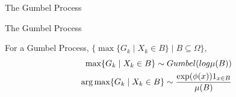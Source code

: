 \begin{frame}{The Gumbel Process}
\end{frame}
\begin{frame}{The Gumbel Process}
    \footnotesize{

      
      \begin{property}
        For a Gumbel Process, $\{ \max \{G_k \mid X_k \in B\} \mid B \subseteq \Omega\}$,
        \begin{align*}
          \max \{G_k \mid X_k \in B\} \sim Gumbel(log \mu(B)) \\
      \operatorname*{{arg\,max}} \{G_k \mid X_k \in B\} \sim \frac{\exp(\phi(x))1_{x \in B}}{\mu(B)}
        \end{align*}
        
      \end{property}
    }
\end{frame}



